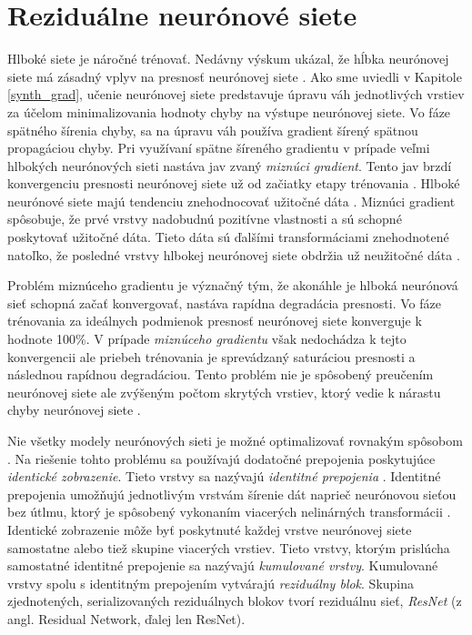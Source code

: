 \chapter{Reziduálne neurónové siete}

\label{ResNet_kap2}

Hlboké siete je náročné trénovať. Nedávny výskum ukázal, že hĺbka neurónovej siete má zásadný vplyv na presnosť neurónovej siete \cite{Wu2017, He2016, Targ2016}. Ako sme uviedli v Kapitole \ref{synth_grad}, učenie neurónovej siete predstavuje úpravu váh jednotlivých vrstiev za účelom minimalizovania hodnoty chyby na výstupe neurónovej siete. Vo fáze spätného šírenia chyby, sa na úpravu váh používa gradient šírený spätnou propagáciou chyby. Pri využívaní spätne šíreného gradientu v prípade veľmi hlbokých neurónových sieti nastáva jav zvaný \textit{miznúci gradient}.
Tento jav brzdí konvergenciu presnosti neurónovej siete už od začiatky etapy trénovania \cite{Wu2017}. Hlboké neurónové siete majú tendenciu znehodnocovať užitočné dáta \cite{Targ2016}. Miznúci gradient spôsobuje, že prvé vrstvy nadobudnú pozitívne vlastnosti a sú schopné poskytovať užitočné dáta. Tieto dáta sú ďalšími transformáciami znehodnotené natoľko, že posledné vrstvy hlbokej neurónovej siete obdržia už neužitočné dáta \cite{Wu2017}.

Problém miznúceho gradientu je význačný tým, že akonáhle je hlboká neurónová sieť schopná začať konvergovať, nastáva rapídna degradácia presnosti. Vo fáze trénovania za ideálnych podmienok presnosť neurónovej siete konverguje k hodnote 100\%. V prípade \textit{miznúceho gradientu} však nedochádza k tejto konvergencii ale priebeh trénovania je sprevádzaný saturáciou presnosti a následnou rapídnou degradáciou. Tento problém nie je spôsobený preučením neurónovej siete ale zvýšeným počtom skrytých vrstiev, ktorý vedie k nárastu chyby neurónovej siete \cite{Wu2017}. 

Nie všetky modely neurónových sieti je možné optimalizovať rovnakým spôsobom \cite{Wu2017}. Na riešenie tohto problému sa používajú dodatočné prepojenia poskytujúce \textit{identické zobrazenie}. Tieto vrstvy sa nazývajú \textit{identitné prepojenia} \cite{Wu2017, Targ2016}. Identitné prepojenia umožňujú jednotlivým vrstvám šírenie dát naprieč neurónovou sieťou bez útlmu, ktorý je spôsobený vykonaním viacerých nelinárných transformácii \cite{Targ2016}. Identické zobrazenie môže byť poskytnuté každej vrstve neurónovej siete samostatne alebo tiež skupine viacerých vrstiev. Tieto vrstvy, ktorým prislúcha samostatné identitné prepojenie sa nazývajú \textit{kumulované vrstvy}. Kumulované vrstvy spolu s identitným prepojením vytvárajú \textit{reziduálny blok}. Skupina zjednotených, serializovaných reziduálnych blokov tvorí reziduálnu sieť, \textit{ResNet} (z angl. Residual Network, ďalej len ResNet).

